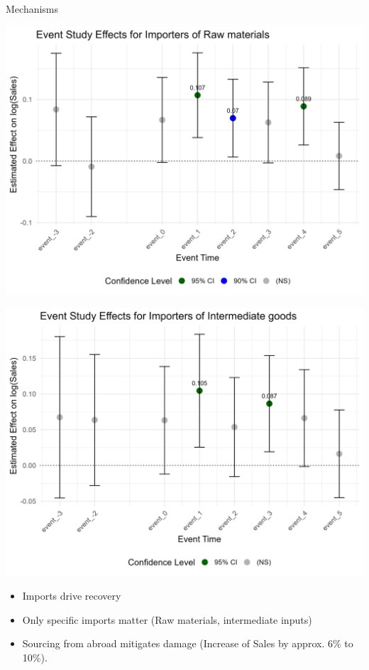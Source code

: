 \documentclass[
  xcolor=svgnames,
  bookmarks=true,
  bookmarksopen=true,
  pdfborder={0 0 0},
  pdfhighlight={/N},
  linkbordercolor={rgb}{0.5,0.5,0.5},
  implicit=false,
  colorlinks=true,
  allcolors=deepblue
]{beamer}
\begin{document}
\begin{frame}{Mechanisms}
\centering
\begin{minipage}{0.49\textwidth}
    \centering
    \includegraphics[width=\linewidth]{Results RawM.png}
\end{minipage}
\hfill
\begin{minipage}{0.49\textwidth}
    \centering
    \includegraphics[width=\linewidth]{Results IntermIn.png}
\end{minipage}
\begin{itemize}
    \item Imports drive recovery
    \item Only specific imports matter (Raw materials, intermediate inputs)
    \item Sourcing from abroad mitigates damage (Increase of Sales by approx. 6\% to 10\%).
\end{itemize}
\end{frame}
\end{document}
